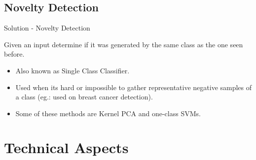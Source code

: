 \documentclass{beamer}
\begin{document}
\subsection{Novelty Detection}
\begin{frame}{Solution - Novelty Detection}
\begin{block}{}
Given an input determine if it was generated by the same class as the one seen before.
\end{block}

\begin{itemize}
\item Also known as Single Class Classifier.
\item Used when its hard or impossible to gather representative negative samples of a class (eg.: used on breast cancer detection).
\item Some of these methods are Kernel PCA and one-class SVMs.
\end{itemize}


\end{frame}




\section{Technical Aspects}
\end{document}
